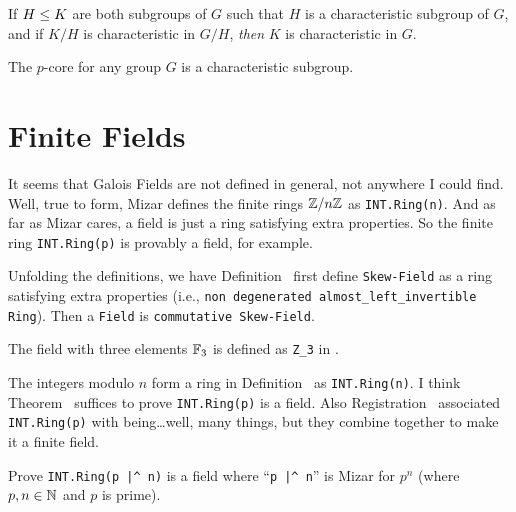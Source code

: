 \begin{theorem}
If  $H\leq K$ are both subgroups of $G$ such that $H$ is
a characteristic subgroup of $G$, and if $K/H$ is characteristic in
$G/H$, \emph{then} $K$ is characteristic in $G$.
\end{theorem}


\begin{theorem}
The $p$-core for any group $G$ is a characteristic subgroup.
\end{theorem}

\section{Finite Fields}

It seems that Galois Fields are not defined in
general, not anywhere I could find. Well, true to form, Mizar defines
the finite rings $\ZZ/n\ZZ$ as \lstinline{INT.Ring(n)}. And as far as
Mizar cares, a field is just a ring satisfying extra properties. So the
finite ring \lstinline{INT.Ring(p)} is provably a field, for example.

Unfolding the definitions, we have Definition~
first define \lstinline{Skew-Field} as a ring satisfying extra properties
(i.e., \lstinline{non degenerated almost_left_invertible Ring}).
Then a \lstinline{Field} is \lstinline{commutative Skew-Field}.

\begin{example}[{$\FF_{3}$}]
The field with three elements $\FF_{3}$ is defined as \lstinline!Z_3!
in .
\end{example}

\begin{example}[{$\ZZ/n\ZZ$}]
The integers modulo $n$ form a ring in Definition~ as
\lstinline{INT.Ring(n)}. I think Theorem~ suffices to
prove \lstinline{INT.Ring(p)} is a field. Also Registration~
associated \lstinline{INT.Ring(p)} with being\dots well, many things,
but they combine together to make it a finite field.
\end{example}

\begin{exercise}
Prove \lstinline{INT.Ring(p |^ n)} is a field where ``\lstinline{p |^ n}''
is Mizar for $p^{n}$ (where $p,n\in\mathbb{N}$ and $p$ is prime).
\end{exercise}

